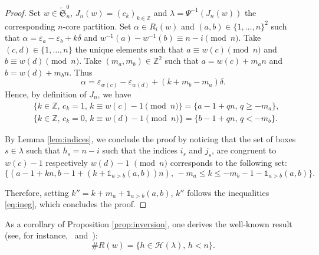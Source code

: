 \documentclass[10pt,a4paper]{amsart}
\numberwithin{equation}{section}
\def\cch{\mathcal H}
\newcommand{\Z}{\mathbb{Z}}
\begin{document}
\begin{proof}
Set $w\in\widetilde{\mathfrak{S}}^0_n$, $J_n(w)=(c_k)_{k\in\Z}$ and $\lambda=\Psi^{-1}(J_n(w))$ the corresponding $n$-core partition. Set $\alpha\in R_i(w)$ and $(a,b)\in\lbrace 1,\dots,n\rbrace^2$ such that $\alpha=\varepsilon_a-\varepsilon_b+k\delta$
and $w^{-1}(a)-w^{-1}(b)\equiv n-i\pmod{n}$. Take $(c,d)\in\lbrace 1,\dots,n\rbrace$ the unique elements such that $a\equiv w(c)\pmod{n}$ and $b\equiv w(d)\pmod{n}$. Take $(m_a,m_b)\in\Z^2$ such that $a=w(c)+m_an$ and $b=w(d)+m_bn$. Thus
\[\alpha=\varepsilon_{w(c)}-\varepsilon_{w(d)}+(k+m_b-m_a)\delta.\]
Hence, by definition of $J_n$, we have
\begin{align*}
&\lbrace k\in \Z,\, c_{k}=1,\, k\equiv w(c)-1\pmod{n}\rbrace=\lbrace a-1+qn,\, q\geq -m_a\rbrace,\\
&\lbrace k\in \Z,\, c_{k}=0,\, k\equiv w(d)-1\pmod{n}\rbrace=\lbrace b-1+qn,\, q< -m_b\rbrace.
\end{align*}


By Lemma \ref{lem:indices}, we conclude the proof by noticing that the set of boxes $s\in\lambda$ such that $h_s=n-i$ such that the indices $i_s$ and $j_s$, are congruent to $w(c)-1$ respectively $w(d)-1$ $\pmod{n}$ corresponds to the following set:
\[\lbrace (a-1+kn,b-1+(k+\mathds{1}_{a>b}(a,b))n),\, -m_a\leq k \leq -m_b-1-\mathds{1}_{a>b}(a,b)\rbrace.
\]


Therefore, setting $k''=k+m_a+\mathds{1}_{a>b}(a,b)$, $k''$ follows the inequalities \eqref{eq:ineg}, which concludes the proof.
\end{proof}


\begin{Remark}
As a corollary of Proposition \ref{prop:inversion}, one derives the well-known result (see, for instance,~\cite[Proposition $1.3$]{LLMSSZ} and~\cite[Theorem $7$]{LapointeMorse}):
\[\#R(w)=\lbrace h\in\cch(\lambda),\, h<n\rbrace.\]
\end{Remark}
\end{document}
